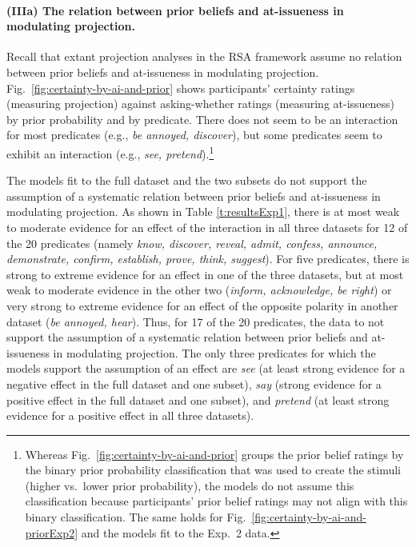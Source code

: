 \documentclass[11pt,fleqn]{article}
\newcommand{\6}{\mbox{$[\hspace*{-.6mm}[$}}
\newcommand{\9}{\mbox{$]\hspace*{-.6mm}]$}}
\begin{document}
\paragraph{(IIIa) The relation between prior beliefs and at-issueness in modulating projection.} Recall that extant projection analyses in the RSA framework assume no relation between prior beliefs and at-issueness in modulating projection. Fig.~\ref{fig:certainty-by-ai-and-prior} shows participants' certainty ratings (measuring projection) against asking-whether ratings (measuring at-issueness) by prior probability and by predicate. There does not seem to be an interaction for most predicates (e.g., {\em be annoyed, discover}), but some predicates seem to exhibit an interaction (e.g., {\em see, pretend}).\footnote{Whereas Fig.~\ref{fig:certainty-by-ai-and-prior} groups the prior belief ratings by the binary prior probability classification that was used to create the stimuli (higher vs.\ lower prior probability), the models  do not assume this classification because participants' prior belief ratings may not align with this binary classification. The same holds for Fig.~\ref{fig:certainty-by-ai-and-priorExp2} and the models fit to the Exp.~2 data.}

The models fit to the full dataset and the two subsets do not support the assumption of a systematic relation between prior beliefs and at-issueness in modulating projection. As shown in Table \ref{t:resultsExp1}, there is at most weak to moderate evidence for an effect of the interaction in all three datasets for 12 of the 20 predicates (namely {\em know, discover, reveal, admit, confess, announce, demonstrate, confirm, establish, prove, think, suggest}). For five predicates, there is strong to extreme evidence for an effect in one of the three datasets, but at most weak to moderate evidence in the other two ({\em inform, acknowledge, be right}) or very strong to extreme evidence for an effect of the opposite polarity in another dataset ({\em be annoyed, hear}).  Thus, for 17 of the 20 predicates, the data to not support the assumption of a systematic relation between prior beliefs and at-issueness in modulating projection. The only three predicates for which the models support the assumption of an effect are {\em see} (at least strong evidence for a negative effect in the full dataset and one subset), {\em say} (strong evidence for a positive effect in the full dataset and one subset), and {\em pretend} (at least strong evidence for a positive effect in all three datasets). 
\end{document}
